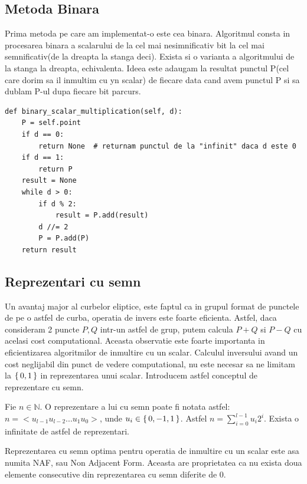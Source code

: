 \subsection{Metoda Binara}

Prima metoda pe care am implementat-o este cea binara. Algoritmul consta in procesarea binara a scalarului de la cel mai nesimnificativ bit la cel mai semnificativ(de la dreapta la stanga deci). Exista si o varianta a algoritmului de la stanga la dreapta, echivalenta. Ideea este adaugam la resultat punctul P(cel care dorim sa il inmultim cu yn scalar) de fiecare data cand avem punctul P si sa dublam P-ul dupa fiecare bit parcurs.

\begin{lstlisting}
def binary_scalar_multiplication(self, d):
    P = self.point
    if d == 0:
        return None  # returnam punctul de la "infinit" daca d este 0
    if d == 1:
        return P
    result = None
    while d > 0:
        if d % 2:
            result = P.add(result)
        d //= 2
        P = P.add(P)
    return result
\end{lstlisting}

\subsection{Reprezentari cu semn}

Un avantaj major al curbelor eliptice, este faptul ca in grupul format de punctele de pe o astfel de curba, operatia de invers este foarte eficienta. Astfel, daca consideram 2 puncte $P, Q$ intr-un astfel de grup, putem calcula $P + Q$ si $P - Q$ cu acelasi cost computational. Aceasta observatie este foarte importanta in eficientizarea algoritmilor de inmultire cu un scalar. Calculul inversului avand un cost neglijabil din punct de vedere computational, nu este necesar sa ne limitam la $\set{0, 1}$ in reprezentarea unui scalar. Introducem astfel conceptul de reprezentare cu semn.

\begin{dfn}
 Fie $n\in\mathbb{N}$. O reprezentare a lui cu semn poate fi notata astfel: $n = <u_{l-1}u_{l-2}...u_1u_0>$, unde $u_i\in\set{0, -1, 1}$. Astfel $n = \sum_{i=0}^{l-1} u_i 2^{i}$. Exista o infinitate de astfel de reprezentari.
\end{dfn}
\begin{dfn}
Reprezentarea cu semn optima pentru operatia de inmultire cu un scalar este asa numita NAF, sau Non Adjacent Form. Aceasta are proprietatea ca nu exista doua elemente consecutive din reprezentarea cu semn diferite de 0.
\end{dfn}

